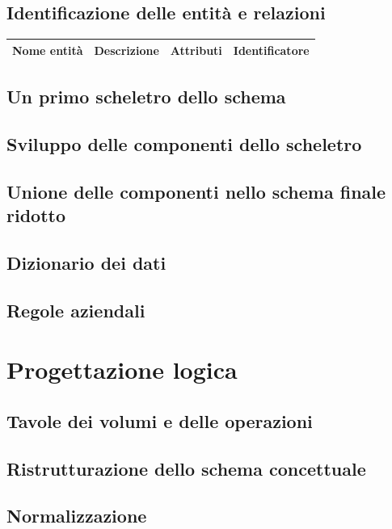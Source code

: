 \documentclass[11pt]{article}
\begin{document}
\subsection{Identificazione delle entità e relazioni}

\begin{center}
\begin{tabularx}{\linewidth}{
    |>{\hsize=1.0\hsize}X|%
    >{\hsize=1.5\hsize}X|%
    >{\hsize=0.8\hsize}X|%
    >{\hsize=0.7\hsize}X|%
    }
    \hline
    \textbf{Nome entità} & \textbf{Descrizione} & \textbf{Attributi} & \textbf{Identificatore} \\
    \hline
\end{tabularx}
\end{center}

\subsection{Un primo scheletro dello schema}
\subsection{Sviluppo delle componenti dello scheletro}
\subsection{Unione delle componenti nello schema finale ridotto}
\subsection{Dizionario dei dati}
\subsection{Regole aziendali}

\section{Progettazione logica}
\subsection{Tavole dei volumi e delle operazioni}
\subsection{Ristrutturazione dello schema concettuale}
\subsection{Normalizzazione}
\end{document}
